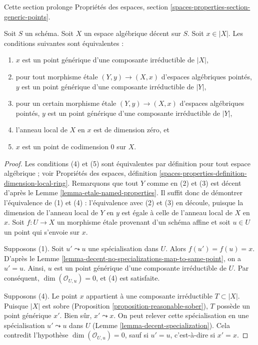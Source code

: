 \noindent
Cette section prolonge
Propriétés des espaces, section
\ref{spaces-properties-section-generic-points}.

\begin{lemma}
\label{lemma-decent-generic-points}
Soit $S$ un schéma. Soit $X$ un espace algébrique décent sur $S$.
Soit $x \in |X|$. Les conditions suivantes sont équivalentes :
\begin{enumerate}
\item $x$ est un point générique d'une composante irréductible de $|X|$,
\item pour tout morphisme étale $(Y, y) \to (X, x)$ d'espaces algébriques
pointés, $y$ est un point générique d'une composante irréductible de $|Y|$,
\item pour un certain morphisme étale $(Y, y) \to (X, x)$ d'espaces
algébriques pointés, $y$ est un point générique d'une composante irréductible
de $|Y|$,
\item l'anneau local de $X$ en $x$ est de dimension zéro, et
\item $x$ est un point de codimension $0$ sur $X$.
\end{enumerate}
\end{lemma}

\begin{proof}
Les conditions (4) et (5) sont équivalentes par définition pour tout espace
algébrique ; voir Propriétés des espaces, définition
\ref{spaces-properties-definition-dimension-local-ring}.
Remarquons que tout $Y$ comme en (2) et (3) est décent d'après le
Lemme \ref{lemma-etale-named-properties}.
Il suffit donc de démontrer l'équivalence de (1) et (4) : l'équivalence avec
(2) et (3) en découle, puisque la dimension de l'anneau local de $Y$ en $y$
est égale à celle de l'anneau local de $X$ en $x$.
Soit $f : U \to X$ un morphisme étale provenant d'un schéma affine et soit
$u \in U$ un point qui s'envoie sur $x$.

\medskip\noindent
Supposons (1). Soit $u' \leadsto u$ une spécialisation dans $U$.
Alors $f(u') = f(u) = x$. D'après le
Lemme \ref{lemma-decent-no-specializations-map-to-same-point},
on a $u' = u$. Ainsi, $u$ est un point générique d'une composante irréductible
de $U$. Par conséquent, $\dim(\mathcal{O}_{U, u}) = 0$, et (4) est satisfaite.

\medskip\noindent
Supposons (4). Le point $x$ appartient à une composante irréductible
$T \subset |X|$. Puisque $|X|$ est sobre
(Proposition \ref{proposition-reasonable-sober}),
$T$ possède un point générique $x'$. Bien sûr, $x' \leadsto x$.
On peut relever cette spécialisation en une spécialisation
$u' \leadsto u$ dans $U$
(Lemme \ref{lemma-decent-specialization}). Cela contredit l'hypothèse
$\dim(\mathcal{O}_{U, u}) = 0$, sauf si $u' = u$, c'est-à-dire si $x' = x$.
\end{proof}

